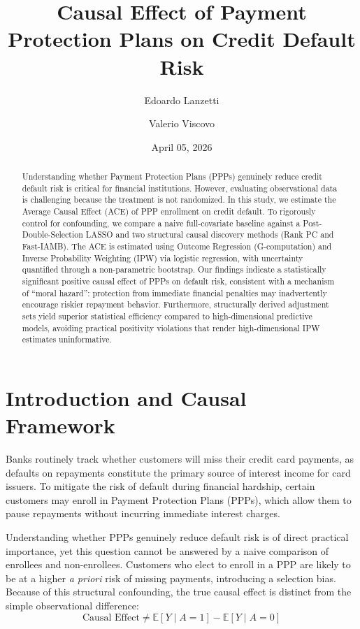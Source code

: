 \documentclass[11pt, a4paper]{article}
\title{\textbf{Causal Effect of Payment Protection Plans on Credit Default Risk}}
\author{Edoardo Lanzetti \and Valerio Viscovo}
\date{April 05, 2026}
\theoremstyle{definition}
\begin{document}
\maketitle

\begin{abstract}
Understanding whether Payment Protection Plans (PPPs) genuinely reduce credit default
risk is critical for financial institutions. However, evaluating observational data is
challenging because the treatment is not randomized. In this study, we estimate the
Average Causal Effect (ACE) of PPP enrollment on credit default. To rigorously control
for confounding, we compare a naive full-covariate baseline against a Post-Double-Selection
LASSO and two structural causal discovery methods (Rank PC and Fast-IAMB). The ACE is
estimated using Outcome Regression (G-computation) and Inverse Probability Weighting (IPW)
via logistic regression, with uncertainty quantified through a non-parametric bootstrap.
Our findings indicate a statistically significant positive causal effect of PPPs on default
risk, consistent with a mechanism of ``moral hazard'': protection from immediate financial
penalties may inadvertently encourage riskier repayment behavior. Furthermore, structurally
derived adjustment sets yield superior statistical efficiency compared to high-dimensional
predictive models, avoiding practical positivity violations that render high-dimensional IPW
estimates uninformative.
\end{abstract}

\section{Introduction and Causal Framework}

Banks routinely track whether customers will miss their credit card payments, as defaults
on repayments constitute the primary source of interest income for card issuers. To
mitigate the risk of default during financial hardship, certain customers may enroll in
Payment Protection Plans (PPPs), which allow them to pause repayments without incurring
immediate interest charges.

Understanding whether PPPs genuinely reduce default risk is of direct practical importance,
yet this question cannot be answered by a naive comparison of enrollees and non-enrollees.
Customers who elect to enroll in a PPP are likely to be at a higher \textit{a priori}
risk of missing payments, introducing a selection bias. Because of this structural
confounding, the true causal effect is distinct from the simple observational difference:
\begin{equation*}
    \text{Causal Effect} \neq \mathbb{E}[Y \mid A=1] - \mathbb{E}[Y \mid A=0]
\end{equation*}
\end{document}
